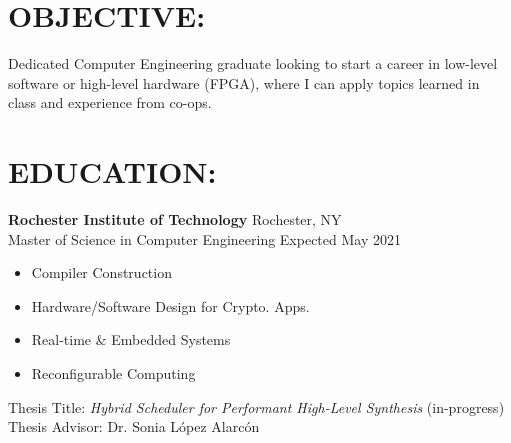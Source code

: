 \documentclass[line,margin]{res}
\newcommand{\SECTIONOFFSET}{-5pt}
\newcommand{\ITEMOFFSET}{-8pt}
\begin{document}
\setlength\columnsep{-30pt}
\email{} %
\phone{} %
\address{} %
\address{} %
\website{} %

\begin{resume}
	 \setlength
	 \multicolsep{2pt}

	\section{OBJECTIVE:} %
		Dedicated Computer Engineering graduate looking to start a career in low-level software or high-level hardware (FPGA), where I can apply topics learned in class and experience from co-ops.

		\vspace{\SECTIONOFFSET}

	\section{EDUCATION:} 
		
		\textbf{Rochester Institute of Technology} \hfill Rochester, NY\\
		Master of Science in Computer Engineering \hfill Expected May 2021

		\begin{multicols}{2}
			\setlength\columnsep{1pt}
			\begin{itemize}
				\setlength{\itemindent}{-10pt}
				\item[] Compiler Construction
				\item[] Hardware/Software Design for Crypto. Apps.
				\item[] \hspace{16pt} Real-time \& Embedded Systems
				\item[] \hspace{16pt} Reconfigurable Computing
			\end{itemize}
		\end{multicols}

		\vspace{-12pt}
		Thesis Title: \textit{Hybrid Scheduler for Performant High-Level Synthesis} (in-progress) \\
		Thesis Advisor: Dr. Sonia L\'opez Alarc\'on 
		\vspace{\ITEMOFFSET}


\end{resume}
\end{document}
